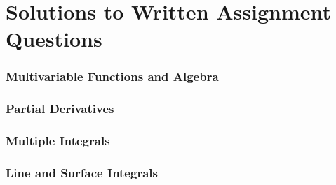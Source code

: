 \documentclass{article}
\begin{document}
\part{Solutions to Written Assignment Questions}
\setcounter{section}{1}

\section{Multivariable Functions and Algebra}
 \newpage %
 \newpage %
 \newpage %
 \newpage %
 \newpage %
 \newpage %
 \newpage %
\section{Partial Derivatives}


\section{Multiple Integrals}





\section{Line and Surface Integrals}
\end{document}
